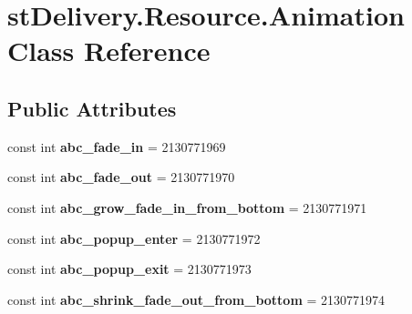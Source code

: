 \hypertarget{classst_delivery_1_1_resource_1_1_animation}{}\section{st\+Delivery.\+Resource.\+Animation Class Reference}
\label{classst_delivery_1_1_resource_1_1_animation}
\subsection*{Public Attributes}
\begin{DoxyCompactItemize}
\item 
\mbox{\label{classst_delivery_1_1_resource_1_1_animation_a9b2e1f5b61d69e0611bf375a0bd7bee2}} 
const int {\bfseries abc\+\_\+fade\+\_\+in} = 2130771969
\item 
\mbox{\label{classst_delivery_1_1_resource_1_1_animation_ade2c7e6c21a98059e61e16f8a4bb3028}} 
const int {\bfseries abc\+\_\+fade\+\_\+out} = 2130771970
\item 
\mbox{\label{classst_delivery_1_1_resource_1_1_animation_ac235c9786388dbf409e071af2f58c52d}} 
const int {\bfseries abc\+\_\+grow\+\_\+fade\+\_\+in\+\_\+from\+\_\+bottom} = 2130771971
\item 
\mbox{\label{classst_delivery_1_1_resource_1_1_animation_a71906f411ad41d8cea752bebe180a7f9}} 
const int {\bfseries abc\+\_\+popup\+\_\+enter} = 2130771972
\item 
\mbox{\label{classst_delivery_1_1_resource_1_1_animation_ae716cdfde947413a61afe47921dc905a}} 
const int {\bfseries abc\+\_\+popup\+\_\+exit} = 2130771973
\item 
\mbox{\label{classst_delivery_1_1_resource_1_1_animation_aa72e1d23b0bd5009575fe8c367ee9e9c}} 
const int {\bfseries abc\+\_\+shrink\+\_\+fade\+\_\+out\+\_\+from\+\_\+bottom} = 2130771974
\item 
\mbox{\label{classst_delivery_1_1_resource_1_1_animation_af2d93e7418351c95107e254d58bf38be}} 

\end{DoxyCompactItemize}
